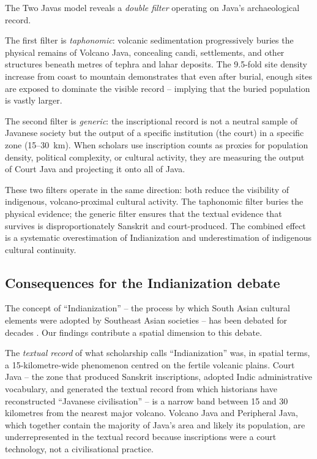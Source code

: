 \documentclass[12pt]{article}
\begin{document}
The Two Javas model reveals a \emph{double filter} operating on Java's archaeological record.

The first filter is \emph{taphonomic}: volcanic sedimentation progressively buries the physical remains of Volcano Java, concealing candi, settlements, and other structures beneath metres of tephra and lahar deposits.
The 9.5-fold site density increase from coast to mountain demonstrates that even after burial, enough sites are exposed to dominate the visible record -- implying that the buried population is vastly larger.

The second filter is \emph{generic}: the inscriptional record is not a neutral sample of Javanese society but the output of a specific institution (the court) in a specific zone (15--30~km).
When scholars use inscription counts as proxies for population density, political complexity, or cultural activity, they are measuring the output of Court Java and projecting it onto all of Java.

These two filters operate in the same direction: both reduce the visibility of indigenous, volcano-proximal cultural activity.
The taphonomic filter buries the physical evidence; the generic filter ensures that the textual evidence that survives is disproportionately Sanskrit and court-produced.
The combined effect is a systematic overestimation of Indianization and underestimation of indigenous cultural continuity.

\subsection{Consequences for the Indianization debate}

The concept of ``Indianization'' -- the process by which South Asian cultural elements were adopted by Southeast Asian societies -- has been debated for decades \citep{Coedes1968, Kulke1990, Pollock2006, Wolters1999}.
Our findings contribute a spatial dimension to this debate.

The \emph{textual record} of what scholarship calls ``Indianization'' was, in spatial terms, a 15-kilometre-wide phenomenon centred on the fertile volcanic plains.
Court Java -- the zone that produced Sanskrit inscriptions, adopted Indic administrative vocabulary, and generated the textual record from which historians have reconstructed ``Javanese civilisation'' -- is a narrow band between 15 and 30 kilometres from the nearest major volcano.
Volcano Java and Peripheral Java, which together contain the majority of Java's area and likely its population, are underrepresented in the textual record because inscriptions were a court technology, not a civilisational practice.
\end{document}

